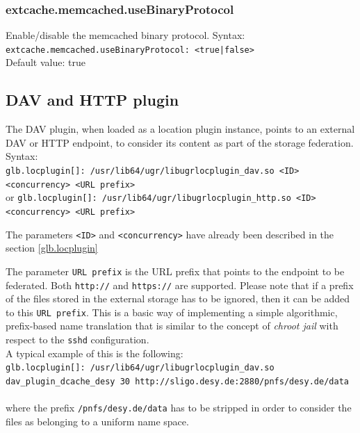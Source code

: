 \documentclass[12pt]{article} %
\begin{document}
\subsubsection{extcache.memcached.useBinaryProtocol}
Enable/disable the memcached binary protocol.
Syntax:\\
\lstinline"extcache.memcached.useBinaryProtocol: <true|false>"\\
Default value: true\\

\subsection{DAV and HTTP plugin}

The DAV plugin, when loaded as a location plugin instance, points to an external DAV or HTTP endpoint, to consider its content as part of the storage federation.\\

Syntax:\\
\lstinline"glb.locplugin[]: /usr/lib64/ugr/libugrlocplugin_dav.so <ID> <concurrency> <URL prefix>"\\
or
\lstinline"glb.locplugin[]: /usr/lib64/ugr/libugrlocplugin_http.so <ID> <concurrency> <URL prefix>"


The parameters \lstinline"<ID>" and \lstinline"<concurrency>" have already been described in the section \ref{glb.locplugin}

The parameter \lstinline"URL prefix" is the URL prefix that points to the endpoint to be federated. Both \lstinline"http://" and \lstinline"https://" are supported. Please note that if a prefix of the files stored in the external storage has to be ignored, then it can be added to this \lstinline"URL prefix". This is a basic way of implementing a simple algorithmic, prefix-based name translation that is similar to the concept of \textit{chroot jail} with respect to the \lstinline"sshd" configuration.\\

A typical example of this is the following:\\
\lstinline"glb.locplugin[]: /usr/lib64/ugr/libugrlocplugin_dav.so dav_plugin_dcache_desy 30 http://sligo.desy.de:2880/pnfs/desy.de/data"\\ \\

where the prefix \lstinline"/pnfs/desy.de/data" has to be stripped in order to consider the files as belonging to a uniform name space.\\
\end{document}
